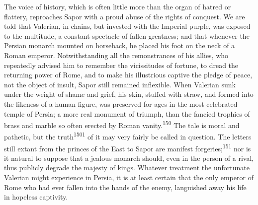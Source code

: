 



The voice of history, which is often little more than the organ
of hatred or flattery, reproaches Sapor with a proud abuse of the
rights of conquest. We are told that Valerian, in chains, but
invested with the Imperial purple, was exposed to the multitude,
a constant spectacle of fallen greatness; and that whenever the
Persian monarch mounted on horseback, he placed his foot on the
neck of a Roman emperor. Notwithstanding all the remonstrances of
his allies, who repeatedly advised him to remember the
vicissitudes of fortune, to dread the returning power of Rome,
and to make his illustrious captive the pledge of peace, not the
object of insult, Sapor still remained inflexible. When Valerian
sunk under the weight of shame and grief, his skin, stuffed with
straw, and formed into the likeness of a human figure, was
preserved for ages in the most celebrated temple of Persia; a
more real monument of triumph, than the fancied trophies of brass
and marble so often erected by Roman vanity.\textsuperscript{150} The tale is
moral and pathetic, but the truth\textsuperscript{1501} of it may very fairly be
called in question. The letters still extant from the princes of
the East to Sapor are manifest forgeries;\textsuperscript{151} nor is it natural
to suppose that a jealous monarch should, even in the person of a
rival, thus publicly degrade the majesty of kings. Whatever
treatment the unfortunate Valerian might experience in Persia, it
is at least certain that the only emperor of Rome who had ever
fallen into the hands of the enemy, languished away his life in
hopeless captivity.


